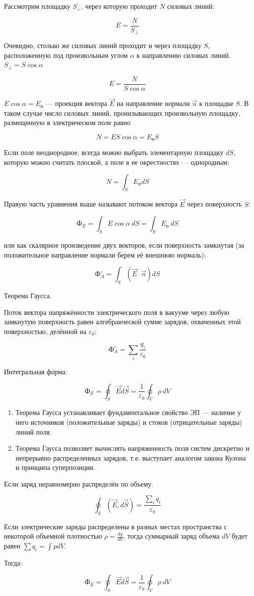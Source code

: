 Рассмотрим площадку $S_\perp$, через которую проходит $N$ силовых линий:

$$E=\frac{N}{S_\perp}$$

Очевидно, столько же силовых линий проходит и через площадку $S$, расположенную под произвольным углом $\alpha$ к направлению силовых линий. $S_\perp=S\cos\alpha$

$$E=\frac{N}{S\cos\alpha}$$

$E\cos\alpha=E_п$ — проекция вектора $\vec E$ на направление нормали $\vec n$ к площадке $S$. 
В таком случае число силовых линий, пронизывающих произвольную площадку, размещенную в электрическом поле равно

$$N=ES\cos\alpha=E_пS$$

Если поле неоднородное, всегда можно выбрать элементарную площадку $dS$, 
которую можно считать плоской, а поле в ее окрестностях — однородным:

$$N=\int_SE_пdS$$

Правую часть уравнения выше называют потоком вектора $\vec E$ через поверхность $S$:

$$Ф_E=\int_SE\cos\alpha\ dS=\int_SE_п\ dS$$

или как скалярное произведение двух векторов, если поверхность замкнутая (за положительное направление нормали берем её внешнюю нормаль):

$$Ф_A^\circ=\int_S(\vec E\cdot\vec n)dS$$

Теорема Гаусса.

Поток вектора напряжённости электрического поля в вакууме через любую замкнутую поверхность равен 
алгебраической сумме зарядов, охваченных этой поверхностью, делённой на $\varepsilon_0$:

$$Ф_A^\circ=\sum_i\frac{q_i}{\varepsilon_0}$$

Интегральная форма:

$$Ф_E=\oint_S\vec Ed\vec S=\frac{1}{\varepsilon_0}\oint_V\rho\ dV$$

\begin{enumerate}
    \item Теорема Гаусса устанавливает фундаментальное свойство ЭП — наличие у него 
    источников (положительные заряды) и стоков (отрицательные заряды) линий поля.
    \item Теорема Гаусса позволяет вычислять напряженность поля систем дискретно и непрерывно распределенных зарядов, 
    т.е. выступает аналогом закона Кулона и принципа суперпозиции.
\end{enumerate}

Если заряд неравномерно распределён по объему.

$$\oint_S(\vec E, d\vec S)=\frac{\sum_iq_i}{\varepsilon_0}$$

Если электрические заряды распределены в разных местах пространства с некоторой объемной плотностью $\rho=\frac{dq}{dV}$, 
тогда суммарный заряд объема $dV$ будет равен $\sum q_i = \int p dV$.

Тогда:

$$Ф_E=\oint_S\vec Ed\vec S=\frac{1}{\varepsilon_0}\oint_V\rho\ dV$$
